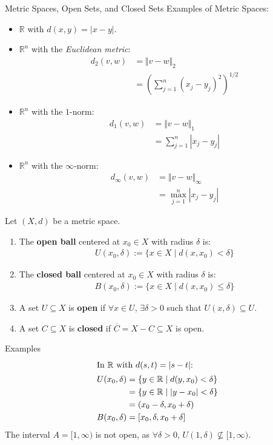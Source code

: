\documentclass[8pt]{extarticle}
\newcommand{\R}{\mathbb{R}}
\begin{document}
  \begin{problem}{Metric Spaces, Open Sets, and Closed Sets}
    Examples of Metric Spaces:
    \begin{itemize}
      \item $\R$ with $d(x,y) = |x-y|$.
      \item $\R^n$ with the \textit{Euclidean metric}:
        \begin{align*}
          d_2(v,w) &= \Vert v - w \Vert_2\\
                   &= \left(\sum_{j=1}^{n}(x_j-y_j)^2\right)^{1/2}
        \end{align*}
      \item $\R^n$ with the $1$-norm:
        \begin{align*}
          d_1(v,w) &= \Vert v-w\Vert_1\\
                   &= \sum_{j=1}^{n} |x_j-y_j|
        \end{align*}
      \item $\R^n$ with the $\infty$-norm:
        \begin{align*}
          d_{\infty}(v,w) &= \Vert v-w\Vert_{\infty}\\
                          &= \max_{j=1}^{n} |x_j-y_j|
        \end{align*}
    \end{itemize}
    Let $(X,d)$ be a metric space.
    \begin{enumerate}[(1)]
      \item The \textbf{open ball} centered at $x_0\in X$ with radius $\delta$ is:
        \begin{align*}
        U(x_0,\delta) := \{x\in X \mid d(x,x_0) < \delta\}
        \end{align*}
      \item The \textbf{closed ball} centered at $x_0\in X$  with radius $\delta$ is:
        \begin{align*}
          B(x_0,\delta) := \{x\in X \mid d(x,x_0) \leq \delta\}
        \end{align*}
      \item A set $U\subseteq X$ is \textbf{open} if $\forall x\in U$, $\exists \delta > 0$ such that $U(x,\delta)\subseteq U$.
      \item A set $C\subseteq X$ is \textbf{closed} if $\overline{C} = X-C\subseteq X$ is open.
    \end{enumerate}
    \begin{problem}{Examples}
      \begin{align*}
        \shortintertext{In $\R$ with $d(s,t) = |s-t|$:}
        U(x_0,\delta) &= \{y\in\R \mid d(y,x_0) < \delta\}\\
                      &= \{y\in\R \mid |y-x_0| < \delta\}\\
                      &= (x_0-\delta,x_0+\delta)\\
        B(x_0,\delta) &= [x_0,\delta,x_0+\delta]
      \end{align*}
      The interval $A = [1,\infty)$ is not open, as $\forall \delta > 0$, $U(1,\delta)\not\subseteq [1,\infty)$.\\


\end{problem}
\end{problem}
\end{document}
